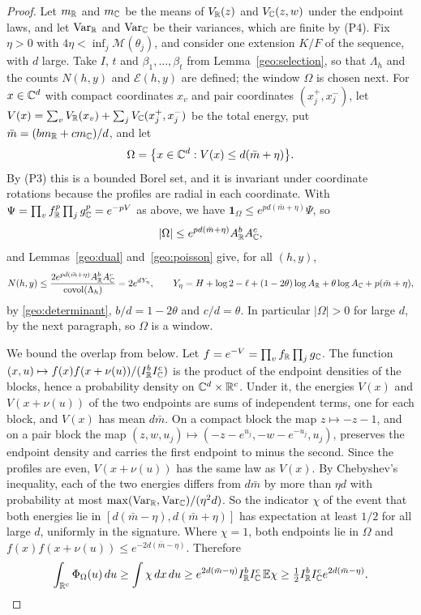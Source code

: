 \begin{proof}
Let $m_\mathbb R$ and $m_\mathbb C$ be the means of $V_\mathbb R(z)$ and $V_\mathbb C(z,w)$ under
the endpoint laws, and let $\mathrm{Var}_\mathbb R$ and $\mathrm{Var}_\mathbb C$ be
their variances, which are finite by (P4). Fix $\eta>0$ with
$4\eta<\inf_j\mathcal M(\theta_j)$, and consider one extension $K/F$ of
the sequence, with $d$ large. Take $I$, $t$ and
$\beta_1,\dots,\beta_t$ from Lemma~\ref{geo:selection}, so that
$\Lambda_h$ and the counts $N(h,y)$ and $\mathcal E(h,y)$ are defined;
the window $\Omega$ is chosen next. For $x\in\mathbb C^d$ with compact
coordinates $x_v$ and pair coordinates $(x_j^+,x_j^-)$, let
$V(x)=\sum_vV_\mathbb R(x_v)+\sum_jV_\mathbb C(x_j^+,x_j^-)$ be the total energy, put
$\bar m=(bm_\mathbb R+cm_\mathbb C)/d$, and let
\[
 \Omega=\bigl\{x\in\mathbb C^d:V(x)\le d(\bar m+\eta)\bigr\}.
\]
By (P3) this is a bounded Borel set, and it is invariant under
coordinate rotations because the profiles are radial in each
coordinate. With $\Psi=\prod_vf_\mathbb R^p\prod_jg_\mathbb C^p=e^{-pV}$ as above, we
have $\mathbf 1_\Omega\le e^{pd(\bar m+\eta)}\Psi$, so
\[
 |\Omega|\le e^{pd(\bar m+\eta)}A_\mathbb R^bA_\mathbb C^c,
\]
and Lemmas~\ref{geo:dual} and~\ref{geo:poisson} give, for all $(h,y)$,
\[
 N(h,y)\le\frac{2e^{pd(\bar m+\eta)}A_\mathbb R^bA_\mathbb C^c}{\operatorname{covol}(\Lambda_h)}
 =2e^{dY_\eta},\qquad
 Y_\eta=H+\log2-\ell+(1-2\theta)\log A_\mathbb R+\theta\log A_\mathbb C
 +p(\bar m+\eta),
\]
by \eqref{geo:determinant}, $b/d=1-2\theta$ and $c/d=\theta$. In
particular $|\Omega|>0$ for large $d$, by the next paragraph, so
$\Omega$ is a window.

We bound the overlap from below. Let $f=e^{-V}=\prod_vf_\mathbb R\prod_jg_\mathbb C$.
The function $(x,u)\mapsto f(x)f(x+\nu(u))/(I_\mathbb R^bI_\mathbb C^c)$ is the product
of the endpoint densities of the blocks, hence a probability density on
$\mathbb C^d\times\mathbb R^c$. Under it, the energies $V(x)$ and $V(x+\nu(u))$ of the
two endpoints are sums of independent terms, one for each block, and
$V(x)$ has mean $d\bar m$. On a compact block the map $z\mapsto-z-1$,
and on a pair block the map
$(z,w,u_j)\mapsto(-z-e^{u_j},-w-e^{-u_j},u_j)$, preserves the endpoint
density and carries the first endpoint to minus the second. Since the
profiles are even, $V(x+\nu(u))$ has the same law as $V(x)$. By
Chebyshev's inequality, each of the two energies differs from $d\bar m$
by more than $\eta d$ with probability at most
$\max(\mathrm{Var}_\mathbb R,\mathrm{Var}_\mathbb C)/(\eta^2d)$. So the indicator
$\chi$ of the event that both energies lie in
$[d(\bar m-\eta),d(\bar m+\eta)]$ has expectation at least $1/2$ for all
large $d$, uniformly in the signature. Where $\chi=1$, both endpoints
lie in $\Omega$ and $f(x)f(x+\nu(u))\le e^{-2d(\bar m-\eta)}$. Therefore
\[
 \int_{\mathbb R^c}\Phi_\Omega(u)\,du\ge\int\chi\,dx\,du
 \ge e^{2d(\bar m-\eta)}I_\mathbb R^bI_\mathbb C^c\,\mathbb E\chi
 \ge\tfrac12I_\mathbb R^bI_\mathbb C^ce^{2d(\bar m-\eta)}.
\]


\end{proof}
